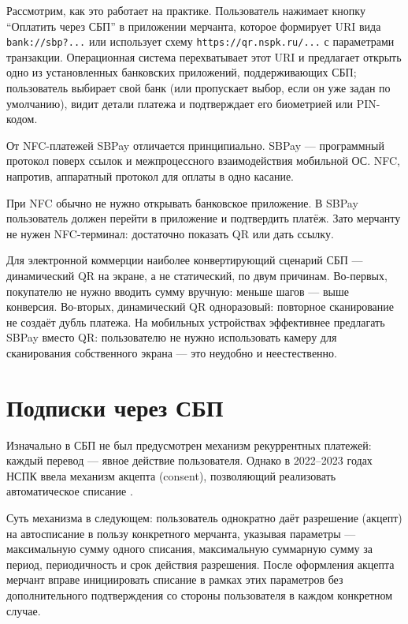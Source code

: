 Рассмотрим, как это работает на практике. Пользователь нажимает
кнопку \enquote{Оплатить через СБП} в приложении мерчанта, которое
формирует URI вида \texttt{bank://sbp?...} или использует схему
\texttt{https://qr.nspk.ru/...} с параметрами транзакции. Операционная
система перехватывает этот URI и предлагает открыть одно из установленных
банковских приложений, поддерживающих СБП; пользователь выбирает
свой банк (или пропускает выбор, если он уже задан по умолчанию),
видит детали платежа и подтверждает его биометрией или PIN-кодом.

От NFC-платежей SBPay отличается принципиально. SBPay — программный
протокол поверх ссылок и межпроцессного взаимодействия мобильной ОС.
NFC, напротив, аппаратный протокол для оплаты в одно касание.

При NFC обычно не нужно открывать банковское приложение. В SBPay
пользователь должен перейти в приложение и подтвердить платёж. Зато
мерчанту не нужен NFC-терминал: достаточно показать QR или дать
ссылку.

\begin{kaobox}[title=На практике]
  Для электронной коммерции наиболее конвертирующий сценарий СБП —
  динамический QR на экране, а не статический, по двум причинам.
  Во-первых, покупателю не нужно вводить сумму вручную: меньше шагов —
  выше конверсия. Во-вторых, динамический QR одноразовый: повторное
  сканирование не создаёт дубль платежа. На мобильных устройствах
  эффективнее предлагать SBPay вместо QR: пользователю не нужно
  использовать камеру для сканирования собственного экрана — это неудобно
  и неестественно.
\end{kaobox}

\section{Подписки через СБП}
\label{sec:sbp-subscriptions}

Изначально в СБП не был предусмотрен механизм рекуррентных платежей:
каждый перевод — явное действие пользователя. Однако в 2022--2023 годах
НСПК ввела механизм акцепта (consent), позволяющий реализовать
автоматическое списание .

Суть механизма в следующем: пользователь однократно даёт разрешение
(акцепт) на автосписание в пользу конкретного мерчанта, указывая
параметры — максимальную сумму одного списания, максимальную суммарную
сумму за период, периодичность и срок действия разрешения. После
оформления акцепта мерчант вправе инициировать списание в рамках этих
параметров без дополнительного подтверждения со стороны пользователя
в каждом конкретном случае.

